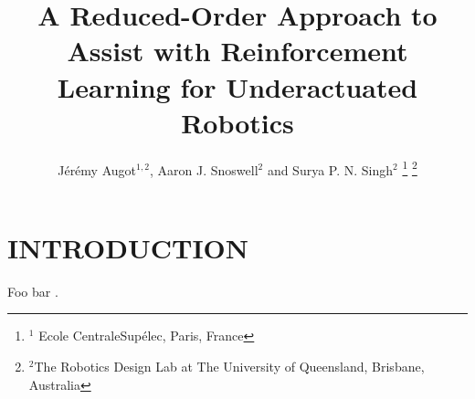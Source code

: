 \documentclass[letterpaper, 10 pt, conference]{ieeeconf}
\title{
    \LARGE \bf%
    A Reduced-Order Approach to Assist with Reinforcement Learning for Underactuated Robotics
}
\author{
    J\'er\'emy Augot$^{1,2}$, Aaron J. Snoswell$^{2}$ and Surya P. N. Singh$^{2}$
    \thanks{
        $^{1}$ Ecole CentraleSup\'elec, Paris, France
    }%
    \thanks{
        $^{2}$The Robotics Design Lab at The University of Queensland, Brisbane, Australia
    }%
}
\begin{document}
\maketitle
\thispagestyle{empty}
\pagestyle{empty}

\begin{abstract}

\lipsum[1]

\end{abstract}

\section{INTRODUCTION}

Foo bar \cite{SAC}.

\lipsum[1-2]
\end{document}
